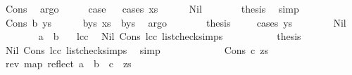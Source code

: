 \begin{isabellebody}
\ Cons\ \isamarkupfalse%
\ argo\isanewline
\ \ \isamarkupfalse%
\ \isamarkupfalse%
\ {\isacharquery}{\kern0pt}case\isanewline
\ \ \isamarkupfalse%
{\isacharparenleft}{\kern0pt}cases\ xs{\isacharparenright}{\kern0pt}\isanewline
\ \ \ \ \isamarkupfalse%
\ Nil\isanewline
\ \ \ \ \isamarkupfalse%
\ \isamarkupfalse%
\ {\isacharquery}{\kern0pt}thesis\ \isamarkupfalse%
\ simp\isanewline
\ \ \isamarkupfalse%
\isanewline
\ \ \ \ \isamarkupfalse%
\ {\isacharparenleft}{\kern0pt}Cons\ b\ ys{\isacharparenright}{\kern0pt}\isanewline
\ \ \ \ \isamarkupfalse%
\ b{\isacharunderscore}{\kern0pt}ys{\isacharcolon}{\kern0pt}\ {\isachardoublequoteopen}xs\ {\isacharequal}{\kern0pt}\ b{\isacharhash}{\kern0pt}ys{\isachardoublequoteclose}\ \isamarkupfalse%
\ argo\isanewline
\ \ \ \ \isamarkupfalse%
\ \isamarkupfalse%
\ {\isacharquery}{\kern0pt}thesis\isanewline
\ \ \ \ \isamarkupfalse%
{\isacharparenleft}{\kern0pt}cases\ ys{\isacharparenright}{\kern0pt}\isanewline
\ \ \ \ \ \ \isamarkupfalse%
\ Nil\isanewline
\ \ \ \ \ \ \isamarkupfalse%
\ {\isachardoublequoteopen}a\ {\isasymnoteq}\ b{\isachardoublequoteclose}\ \isamarkupfalse%
\ \ lcc\ \isamarkupfalse%
\ Nil\ Cons\ lcc\ list{\isacharunderscore}{\kern0pt}check{\isachardot}{\kern0pt}simps\ \isakeywordONE{{\isachardot}{\kern0pt}}\isamarkupfalse%
\isanewline
\ \ \ \ \ \ \isamarkupfalse%
\ \isamarkupfalse%
\ {\isacharquery}{\kern0pt}thesis\ \isamarkupfalse%
\ Nil\ Cons\ lcc\ list{\isacharunderscore}{\kern0pt}check{\isachardot}{\kern0pt}simps\ \isamarkupfalse%
\ simp\isanewline
\ \ \ \ \isamarkupfalse%
\isanewline
\ \ \ \ \ \ \isamarkupfalse%
\ {\isacharparenleft}{\kern0pt}Cons\ c\ zs{\isacharparenright}{\kern0pt}\isanewline
\ \ \ \ \ \ \isamarkupfalse%
\ {}{\isacharcolon}{\kern0pt}{\isachardoublequoteopen}{\isacharparenleft}{\kern0pt}rev\ {\isacharparenleft}{\kern0pt}map\ reflect\ {\isacharparenleft}{\kern0pt}a\ {\isacharhash}{\kern0pt}\ b\ {\isacharhash}{\kern0pt}\ c\ {\isacharhash}{\kern0pt}\ zs{\isacharparenright}{\kern0pt}{\isacharparenright}{\kern0pt}{\isacharparenright}{\kern0pt}\ \isanewline

\end{isabellebody}
